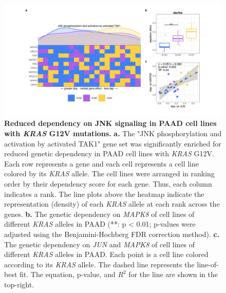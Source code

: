 \documentclass[english, 10pt, letterpaper]{article}
\newcommand{\KRAS}{\emph{KRAS}}
\begin{document}
\begin{figure}[p]
\centering
\includegraphics[width=\textwidth]{figures/SuppFigure_14.jpeg}
\caption{
    \textbf{Reduced dependency on JNK signaling in PAAD cell lines with \KRAS{} G12V mutations.}
    \textbf{a.} The "JNK phosphorylation and activation by activated TAK1" gene set was significantly enriched for reduced genetic dependency in PAAD cell lines with \KRAS{} G12V. Each row represents a gene and each cell represents a cell line colored by its \KRAS{} allele. The cell lines were arranged in ranking order by their dependency score for each gene. Thus, each column indicates a rank. The line plots above the heatmap indicate the representation (density) of each \KRAS{} allele at each rank across the genes.
    \textbf{b.} The genetic dependency on \emph{MAPK8} of cell lines of different \KRAS{} alleles in PAAD (**: p < 0.01; p-values were adjusted using the Benjamini-Hochberg FDR correction method).
    \textbf{c.} The genetic dependency on \emph{JUN} and \emph{MAPK8} of cell lines of different \KRAS{} alleles in PAAD. Each point is a cell line colored according to its \KRAS{} allele. The dashed line represents the line-of-best fit. The equation, p-value, and $R^2$ for the line are shown in the top-right.
}
\label{sfig:paad-dependency-JUN}
\end{figure}
\end{document}
